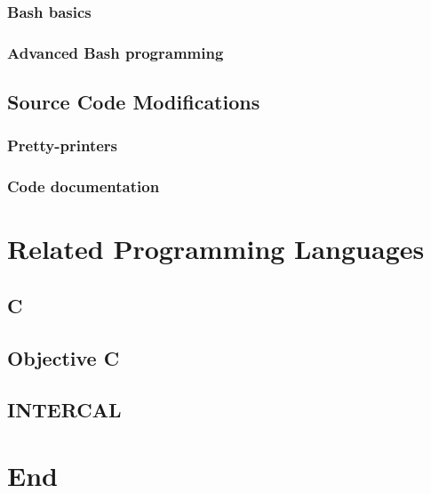 \documentclass[11pt,twoside]{book}
\begin{document}
\section{Bash basics}

\section{Advanced Bash programming}



\chapter{Source Code Modifications}

\section{Pretty-printers}

\section{Code documentation}



\part{Related Programming Languages}

\chapter{C}

\chapter{Objective C}

\chapter{INTERCAL}


\part{End}



\end{document}
